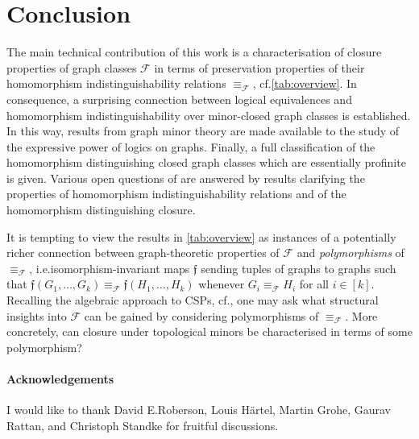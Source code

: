 \documentclass[3p,final]{elsarticle}
\begin{document}
	\section{Conclusion}
	
	The main technical contribution of this work is a characterisation of closure properties of graph classes $\mathcal{F}$ in terms of preservation properties of their homomorphism indistinguishability relations $\equiv_{\mathcal{F}}$, cf.\@ \cref{tab:overview}.
	In consequence, a surprising connection between logical equivalences and homomorphism indistinguishability over minor-closed graph classes is established.
	In this way, results from graph minor theory are made available to the study of the expressive power of logics on graphs.
	Finally, a full classification of the homomorphism distinguishing closed graph classes which are essentially profinite is given. 
	Various open questions of \cite{roberson_oddomorphisms_2022} are answered by results clarifying the properties of homomorphism indistinguishability relations and of the homomorphism distinguishing closure.
	
	It is tempting to view the results in \cref{tab:overview} as instances of a potentially richer connection between graph-theoretic properties of $\mathcal{F}$ and \emph{polymorphisms} of $\equiv_{\mathcal{F}}$, i.e.\@ isomorphism-invariant maps $\mathfrak{f}$ sending tuples of graphs to graphs such that $\mathfrak{f}(G_1, \dots, G_k) \equiv_{\mathcal{F}} \mathfrak{f}(H_1, \dots, H_k)$ whenever $G_i \equiv_{\mathcal{F}} H_i$ for all $i \in [k]$.
	Recalling the algebraic approach to CSPs, cf.\@ \cite{barto_polymorphisms_2017}, one may ask what structural insights into $\mathcal{F}$ can be gained by considering polymorphisms of $\equiv_{\mathcal{F}}$.
	More concretely, can closure under topological minors be characterised in terms of some polymorphism?
	
	\paragraph*{Acknowledgements}
	I would like to thank David E.\@ Roberson, Louis Härtel, Martin Grohe, Gaurav Rattan, and Christoph Standke for fruitful discussions.
	
	
	
\end{document}
